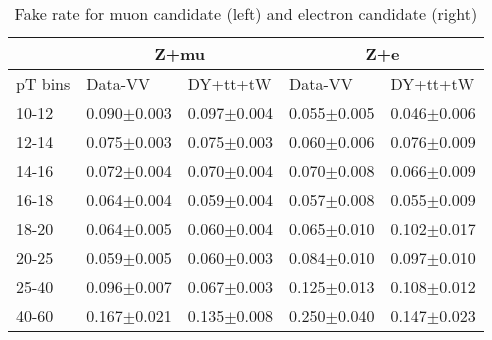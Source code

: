 
\begin{table}[ht]
	\setlength{\tabcolsep}{1em}
    \renewcommand{\arraystretch}{1.5}
  	\centering
  	\caption{Fake rate for muon candidate (left) and electron candidate (right) }
  	\begin{tabular}{l|ll|ll}
  	\hline
  	        & \multicolumn{2}{c|}{Z+mu}          & \multicolumn{2}{c}{Z+e}           \\
	\hline
	pT bins & Data-VV            & DY+tt+tW         & Data-VV            & DY+tt+tW         \\
	\hline
    10-12   & 0.090$\pm$0.003    & 0.097$\pm$0.004  & 0.055$\pm$0.005    & 0.046$\pm$0.006  \\
    12-14   & 0.075$\pm$0.003    & 0.075$\pm$0.003  & 0.060$\pm$0.006    & 0.076$\pm$0.009  \\
    14-16   & 0.072$\pm$0.004    & 0.070$\pm$0.004  & 0.070$\pm$0.008    & 0.066$\pm$0.009  \\
    16-18   & 0.064$\pm$0.004    & 0.059$\pm$0.004  & 0.057$\pm$0.008    & 0.055$\pm$0.009  \\
    18-20   & 0.064$\pm$0.005    & 0.060$\pm$0.004  & 0.065$\pm$0.010    & 0.102$\pm$0.017  \\
    20-25   & 0.059$\pm$0.005    & 0.060$\pm$0.003  & 0.084$\pm$0.010    & 0.097$\pm$0.010  \\
    25-40   & 0.096$\pm$0.007    & 0.067$\pm$0.003  & 0.125$\pm$0.013    & 0.108$\pm$0.012  \\
    40-60   & 0.167$\pm$0.021    & 0.135$\pm$0.008  & 0.250$\pm$0.040    & 0.147$\pm$0.023  \\
    \hline
    \end{tabular}
    
    \label{tab:lepton_fr}
\end{table}
